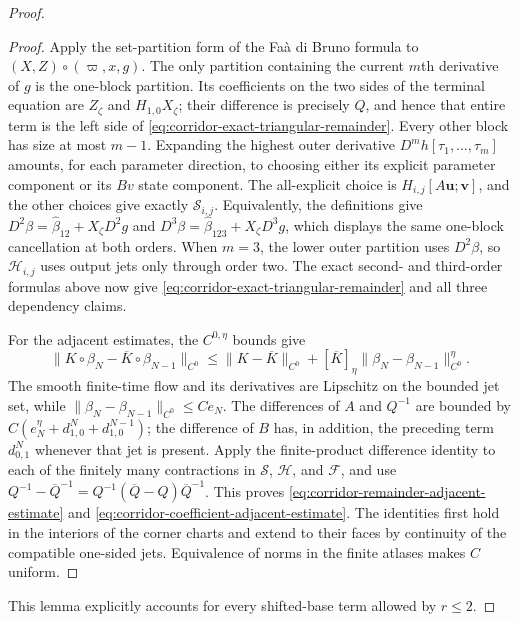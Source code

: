 \documentclass[11pt]{amsart}
\numberwithin{equation}{section}
\theoremstyle{definition}
\theoremstyle{remark}
\begin{document}
\begin{proof}
\begin{proof}
Apply the set-partition form of the Fa\`a di Bruno formula to
$(X,Z)\circ(\varpi,x,g)$.  The only partition containing the current
$m$th derivative of $g$ is the one-block partition.  Its coefficients on
the two sides of the terminal equation are $Z_\zeta$ and
$H_{1,0}X_\zeta$; their difference is precisely $Q$, and hence that
entire term is the left side of
\eqref{eq:corridor-exact-triangular-remainder}.  Every other block has
size at most $m-1$.  Expanding the highest outer derivative
$D^mh[\tau_1,\ldots,\tau_m]$ amounts, for each parameter direction, to
choosing either its explicit parameter component or its $Bv$ state
component.  The all-explicit choice is $H_{i,j}[A\mathbf u;\mathbf v]$,
and the other choices give exactly $\mathcal S_{i,j}$.  Equivalently, the
definitions give
$D^2\beta=\widehat\beta_{12}+X_\zeta D^2g$ and
$D^3\beta=\widehat\beta_{123}+X_\zeta D^3g$, which displays the same
one-block cancellation at both orders.  When $m=3$, the lower outer
partition uses $D^2\beta$, so
$\mathcal H_{i,j}$ uses output jets only through order two.  The exact
second- and third-order formulas above now give
\eqref{eq:corridor-exact-triangular-remainder} and all three dependency
claims.

For the adjacent estimates, the $C^{0,\eta}$ bounds give
\[
 \|K\circ\beta_N-\overline K\circ\beta_{N-1}\|_{C^0}
 \le \|K-\overline K\|_{C^0}
   +[\overline K]_\eta
      \|\beta_N-\beta_{N-1}\|_{C^0}^{\eta}.
\]
The smooth finite-time flow and its derivatives are Lipschitz on the
bounded jet set, while
$\|\beta_N-\beta_{N-1}\|_{C^0}\le Ce_N$.
The differences of $A$ and $Q^{-1}$ are bounded by
$C(e_N^\eta+d_{1,0}^{N}+d_{1,0}^{N-1})$; the difference of $B$ has, in
addition, the preceding term $d_{0,1}^N$ whenever that jet is present.
Apply the finite-product
difference identity to each of the finitely many contractions in
$\mathcal S$, $\mathcal H$, and $\mathcal F$, and use
$Q^{-1}-\overline Q^{-1}=Q^{-1}(\overline Q-Q)\overline Q^{-1}$.
This proves
\eqref{eq:corridor-remainder-adjacent-estimate} and
\eqref{eq:corridor-coefficient-adjacent-estimate}.  The identities first
hold in the interiors of the corner charts and extend to their faces by
continuity of the compatible one-sided jets.  Equivalence of norms in the
finite atlases makes $C$ uniform.
\end{proof}

This lemma explicitly accounts for every shifted-base term allowed by
$r\le2$.


\end{proof}
\end{document}
